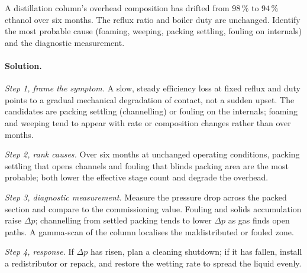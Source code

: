 \begin{exercise}
A distillation column's overhead composition has drifted from
$98\,\%$ to $94\,\%$ ethanol over six months. The reflux ratio and
boiler duty are unchanged. Identify the most probable cause
(foaming, weeping, packing settling, fouling on internals) and the
diagnostic measurement.

\paragraph{Solution.}
\textit{Step 1, frame the symptom.} A slow, steady efficiency loss at
fixed reflux and duty points to a gradual mechanical degradation of
contact, not a sudden upset. The candidates are packing settling
(channelling) or fouling on the internals; foaming and weeping tend to
appear with rate or composition changes rather than over months.

\textit{Step 2, rank causes.} Over six months at unchanged operating
conditions, packing settling that opens channels and fouling that
blinds packing area are the most probable; both lower the effective
stage count and degrade the overhead.

\textit{Step 3, diagnostic measurement.} Measure the pressure drop
across the packed section and compare to the commissioning value.
Fouling and solids accumulation raise $\Delta p$; channelling from
settled packing tends to lower $\Delta p$ as gas finds open paths. A
gamma-scan of the column localises the maldistributed or fouled zone.

\textit{Step 4, response.} If $\Delta p$ has risen, plan a cleaning
shutdown; if it has fallen, install a redistributor or repack, and
restore the wetting rate to spread the liquid evenly.
\end{exercise}

